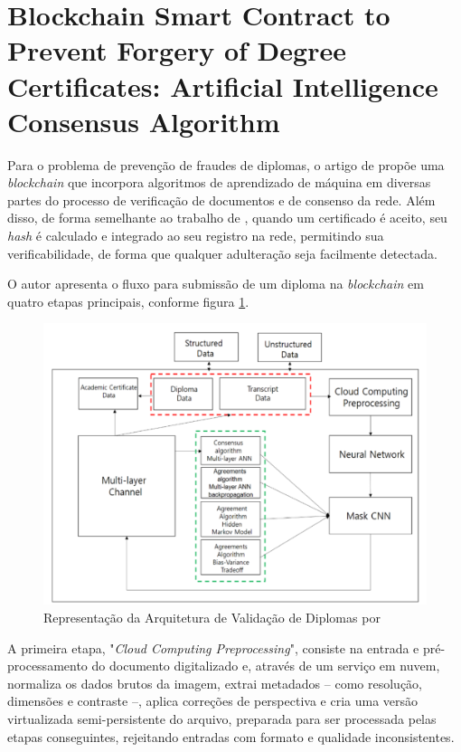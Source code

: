 \section{Blockchain Smart Contract to Prevent Forgery of Degree Certificates:
Artificial Intelligence Consensus Algorithm}

Para o problema de prevenção de fraudes de diplomas, o artigo de \citeauthor*{blockchainforgery} \cite*{blockchainforgery} propõe uma \textit{blockchain} que incorpora algoritmos de aprendizado de máquina em diversas partes do processo de verificação de documentos e de consenso da rede. Além disso, de forma semelhante ao trabalho de \citeauthor*{hashdetection} \cite*{hashdetection}, quando um certificado é aceito, seu \textit{hash} é calculado e integrado ao seu registro na rede, permitindo sua verificabilidade, de forma que qualquer adulteração seja facilmente detectada.

O autor apresenta o fluxo para submissão de um diploma na \textit{blockchain} em quatro etapas principais, conforme figura \ref{fig:blockchainforgery}.

\begin{figure}[H]
	\caption{\label{fig:blockchainforgery}Representação da Arquitetura de Validação de Diplomas por \citeauthor*{blockchainforgery}}
    \begin{center}
    \includegraphics[width=1\linewidth]{images/blockchainforgery.png}
	\end{center}
\end{figure}
 
A primeira etapa, "\textit{Cloud Computing Preprocessing}", consiste na entrada e pré-processamento do documento digitalizado e, através de um serviço em nuvem, normaliza os dados brutos da imagem, extrai metadados -- como resolução, dimensões e contraste --, aplica correções de perspectiva e cria uma versão virtualizada semi-persistente do arquivo, preparada para ser processada pelas etapas conseguintes, rejeitando entradas com formato e qualidade inconsistentes.

